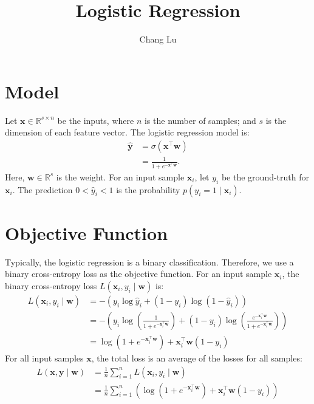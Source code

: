 \documentclass{article}
\title{Logistic Regression}
\author{Chang Lu}
\begin{document}
\maketitle

\section{Model}
Let $\mathbf{x} \in \mathbb{R}^{s \times n}$ be the inputs, where $n$ is the number of samples; and $s$ is the dimension of each feature vector. The logistic regression model is:
\begin{align}
    \hat{\mathbf{y}} &= \sigma\left(\mathbf{x}^\top\mathbf{w}\right) \\
    & = \frac{1}{1 + e^{-\mathbf{x^\top w}}}.
\end{align}
Here, $\mathbf{w} \in \mathbb{R}^s$ is the weight. For an input sample $\mathbf{x}_i$, let $y_i$ be the ground-truth for $\mathbf{x}_i$. The prediction $0 < \hat{{y}}_i < 1$ is the probability $p\left(y_i = 1 \mid \mathbf{x}_i\right)$.

\section{Objective Function}
Typically, the logistic regression is a binary classification. Therefore, we use a binary cross-entropy loss as the objective function. For an input sample $\mathbf{x}_i$, the binary cross-entropy loss $L(\mathbf{x}_i, y_i \mid \mathbf{w})$ is:
\begin{align}
    L(\mathbf{x}_i, y_i \mid \mathbf{w}) &= -\left(y_i \log\hat{y}_i + \left(1 - y_i\right)\log\left(1 - \hat{y}_i\right)\right) \\
    &= -\left(y_i \log\left(\frac{1}{1 + e^{-\mathbf{x}^\top_i\mathbf{w}}}\right) + \left(1 - y_i\right)\log\left(\frac{e^{-\mathbf{x}^\top_i\mathbf{w}}}{1 + e^{-\mathbf{x}^\top_i\mathbf{w}}}\right)\right) \\
    &= \log\left(1 + e^{-\mathbf{x}^\top_i\mathbf{w}}\right) + \mathbf{x}^\top_i\mathbf{w}\left(1 - y_i\right)
\end{align}
For all input samples $\mathbf{x}$, the total loss is an average of the losses for all samples:
\begin{align}
    L(\mathbf{x}, \mathbf{y} \mid \mathbf{w}) &= \frac{1}{n}\sum_{i = 1}^{n}{L(\mathbf{x}_i, y_i \mid \mathbf{w})} \\
    &= \frac{1}{n}\sum_{i = 1}^{n}{\left(\log\left(1 + e^{-\mathbf{x}^\top_i\mathbf{w}}\right) + \mathbf{x}^\top_i\mathbf{w}\left(1 - y_i\right)\right)}
\end{align}
\end{document}
